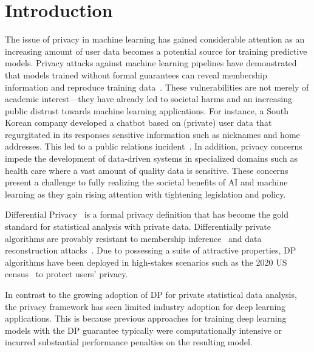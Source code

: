 \chapter{Introduction}

The issue of privacy in machine learning has gained considerable attention as an increasing amount of user data becomes a potential source for training predictive models.
Privacy attacks against machine learning pipelines have demonstrated that models trained without formal guarantees can reveal membership information and reproduce training data~\cite{shokri2017membership,carlini2021extracting}.
These vulnerabilities are not merely of academic interest---they have already led to societal harms and an increasing public distrust towards machine learning applications.
For instance, a South Korean company developed a chatbot based on (private) user data that regurgitated in its responses sensitive information such as nicknames and home addresses. This led to a public relations incident~\cite{sk-chatbot}.
In addition, privacy concerns impede the development of data-driven systems in specialized domains such as health care where a vast amount of quality data is sensitive.
These concerns present a challenge to fully realizing the societal benefits of AI and machine learning as they gain rising attention with tightening legislation and policy.

Differential Privacy~\cite[DP]{dwork2014algorithmic} is a formal privacy definition that has become the gold standard for statistical analysis with private data.
Differentially private algorithms are provably resistant to membership inference~\cite{yeom2018privacy,wasserman2010statistical} and data reconstruction attacks~\cite{pmlr-v162-guo22c,hayes2023bounding}.
Due to possessing a suite of attractive properties, DP algorithms have been deployed in high-stakes scenarios such as the 2020 US census~\cite{us-census} to protect users' privacy.

In contrast to the growing adoption of DP for private statistical data analysis, the privacy framework has seen limited industry adoption for deep learning applications.
This is because previous approaches for training deep learning models with the DP guarantee typically were computationally intensive or incurred substantial performance penalties on the resulting model.

